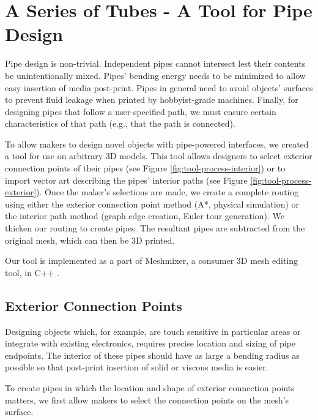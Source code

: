 \section{A Series of Tubes - A Tool for Pipe Design}

Pipe design is non-trivial.  Independent pipes cannot intersect lest their contents be unintentionally mixed.  Pipes' bending energy needs to be minimized to allow easy insertion of media post-print.  Pipes in general need to avoid objects' surfaces to prevent fluid leakage when printed by hobbyist-grade machines.  Finally, for designing pipes that follow a user-specified path, we must ensure certain characteristics of that path (e.g., that the path is connected).

To allow makers to design novel objects with pipe-powered interfaces, we created a tool for use on arbitrary 3D models.  This tool allows designers to select exterior connection points of their pipes (see Figure \ref{fig:tool-process-interior}) or to import vector art describing the pipes' interior paths (see Figure \ref{fig:tool-process-exterior}).  Once the maker's selections are made, we create a complete routing using either the exterior connection point method (A*, physical simulation) or the interior path method (graph edge creation, Euler tour generation).  We thicken our routing to create pipes.  The resultant pipes are subtracted from the original mesh, which can then be 3D printed.

Our tool is implemented as a part of Meshmixer, a consumer 3D mesh editing tool, in C++ \cite{Schmidt-meshmixer}.

\subsection{Exterior Connection Points}

Designing objects which, for example, are touch sensitive in particular areas or integrate with existing electronics, requires precise location and sizing of pipe endpoints.  The interior of these pipes should have as large a bending radius as possible so that post-print insertion of solid or viscous media is easier.

To create pipes in which the location and shape of exterior connection points matters, we first allow makers to select the connection points on the mesh's surface.

